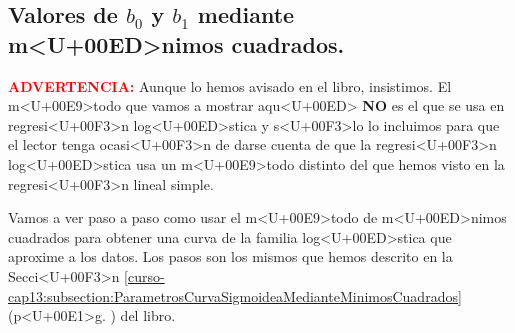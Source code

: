 \documentclass[10pt,a4paper]{article}
\begin{document}
\subsection{Valores de $b_0$ y $b_1$  mediante m<U+00ED>nimos cuadrados.}
\textcolor{red}{\bf\sc ADVERTENCIA:} Aunque lo hemos avisado en el libro, insistimos. El m<U+00E9>todo que vamos a mostrar aqu<U+00ED> {\bf NO} es el que se usa en regresi<U+00F3>n log<U+00ED>stica y s<U+00F3>lo lo incluimos para que el lector tenga ocasi<U+00F3>n de darse cuenta de que la regresi<U+00F3>n log<U+00ED>stica usa un m<U+00E9>todo distinto del que hemos visto en la regresi<U+00F3>n lineal simple.

Vamos a ver paso a paso como usar el m<U+00E9>todo de m<U+00ED>nimos cuadrados para obtener una curva de la familia log<U+00ED>stica que aproxime a los datos. Los pasos son los mismos que hemos descrito en la Secci<U+00F3>n \ref{curso-cap13:subsection:ParametrosCurvaSigmoideaMedianteMinimosCuadrados} (p<U+00E1>g. \pageref{curso-cap13:subsection:ParametrosCurvaSigmoideaMedianteMinimosCuadrados}) del libro.
\end{document}
